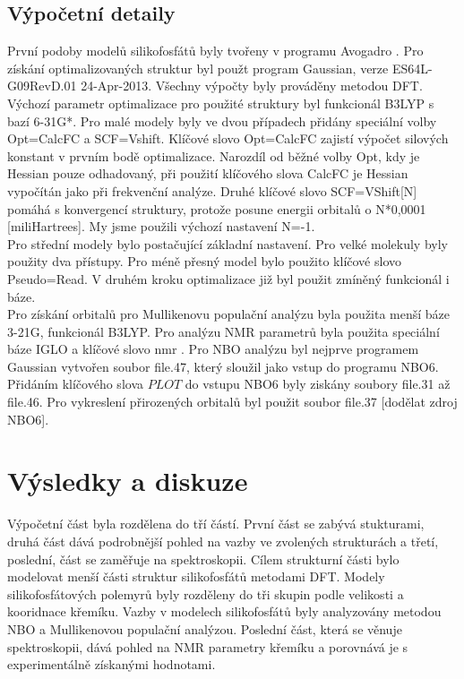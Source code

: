 \documentclass[
  digital, %
  table,   %
  lof,     %
  lot,     %
  oneside,
]{fithesis3}
\begin{document}
\section{Výpočetní detaily}
První podoby modelů silikofosfátů byly tvořeny v programu Avogadro \cite{Avogadro}. Pro získání optimalizovaných struktur byl použt program Gaussian, verze ES64L-G09RevD.01 24-Apr-2013. Všechny výpočty byly prováděny metodou DFT. Výchozí parametr optimalizace pro použité struktury byl funkcionál B3LYP s bazí 6-31G*. Pro malé modely byly ve dvou případech přidány speciální volby Opt=CalcFC a SCF=Vshift. Klíčové slovo Opt=CalcFC zajistí výpočet silových konstant v prvním bodě optimalizace. Narozdíl od běžné volby Opt, kdy je Hessian pouze odhadovaný, při použití klíčového slova CalcFC je Hessian vypočítán jako při frekvenční analýze. Druhé klíčové slovo SCF=VShift[N] pomáhá s konvergencí struktury, protože posune energii orbitalů o N*0,0001 [miliHartrees]. My jsme použili výchozí nastavení N=-1. \\
Pro střední modely bylo postačující základní nastavení. Pro velké molekuly byly použity dva přístupy. Pro méně přesný model bylo použito klíčové slovo Pseudo=Read. V druhém kroku optimalizace již byl použit zmíněný funkcionál i báze. \\
Pro získání orbitalů pro Mullikenovu populační analýzu byla použita menší báze 3-21G, funkcionál B3LYP. Pro analýzu NMR parametrů byla použita speciální báze IGLO \cite{iglo} a klíčové slovo nmr \cite{g09}.
 Pro NBO analýzu byl nejprve programem Gaussian vytvořen soubor file.47, který sloužil jako vstup do programu NBO6. Přidáním klíčového slova $PLOT$ do vstupu NBO6 byly ziskány soubory file.31 až file.46. Pro vykreslení přirozených orbitalů byl použit soubor file.37 [dodělat zdroj NBO6].



\chapter{Výsledky a diskuze}
Výpočetní část byla rozdělena do tří částí. První část se zabývá stukturami, druhá část dává podrobnější pohled na vazby ve zvolených strukturách a třetí, poslední, část se zaměřuje na spektroskopii.
Cílem strukturní části bylo modelovat menší části struktur silikofosfátů metodami DFT. Modely silikofosfátových polemyrů byly rozděleny do tři skupin podle velikosti a kooridnace křemíku. Vazby v modelech silikofosfátů byly analyzovány metodou NBO a Mullikenovou populační analýzou. Poslední část, která se věnuje spektroskopii, dává pohled na NMR parametry křemíku a porovnává je s experimentálně získanými hodnotami.
\end{document}
